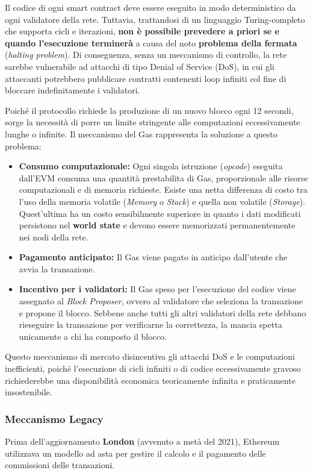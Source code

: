 Il codice di ogni smart contract deve essere eseguito in modo deterministico da ogni validatore della rete. Tuttavia, trattandosi di un linguaggio Turing-completo che supporta cicli e iterazioni, \textbf{non è possibile prevedere a priori se e quando l'esecuzione terminerà} a causa del noto \textbf{problema della fermata} (\textit{halting problem}). Di conseguenza, senza un meccanismo di controllo, la rete sarebbe vulnerabile ad attacchi di tipo Denial of Service (DoS), in cui gli attaccanti potrebbero pubblicare contratti contenenti loop infiniti col fine di bloccare indefinitamente i validatori.

Poiché il protocollo richiede la produzione di un nuovo blocco ogni 12 secondi, sorge la necessità di porre un limite stringente alle computazioni eccessivamente lunghe o infinite. Il meccanismo del Gas rappresenta la soluzione a questo problema:

\begin{itemize}
    \item \textbf{Consumo computazionale:} Ogni singola istruzione (\textit{opcode}) eseguita dall'EVM consuma una quantità prestabilita di Gas, proporzionale alle risorse computazionali e di memoria richieste. Esiste una netta differenza di costo tra l'uso della memoria volatile (\textit{Memory} o \textit{Stack}) e quella non volatile (\textit{Storage}). Quest'ultima ha un costo sensibilmente superiore in quanto i dati modificati persistono nel \textbf{world state} e devono essere memorizzati permanentemente nei nodi della rete.
    \item \textbf{Pagamento anticipato:} Il Gas viene pagato in anticipo dall'utente che avvia la transazione. 
    \item \textbf{Incentivo per i validatori:} Il Gas speso per l'esecuzione del codice viene assegnato al \textit{Block Proposer}, ovvero al validatore che seleziona la transazione e propone il blocco. Sebbene anche tutti gli altri validatori della rete debbano rieseguire la transazione per verificarne la correttezza, la mancia spetta unicamente a chi ha composto il blocco.
\end{itemize}
Questo meccanismo di mercato disincentiva gli attacchi DoS e le computazioni inefficienti, poiché l'esecuzione di cicli infiniti o di codice eccessivamente gravoso richiederebbe una disponibilità economica teoricamente infinita e praticamente insostenibile.

\subsubsection{Meccanismo Legacy}
Prima dell'aggiornamento \textbf{London} (avvenuto a metà del 2021), Ethereum utilizzava un modello ad asta per gestire il calcolo e il pagamento delle commissioni delle transazioni. 

